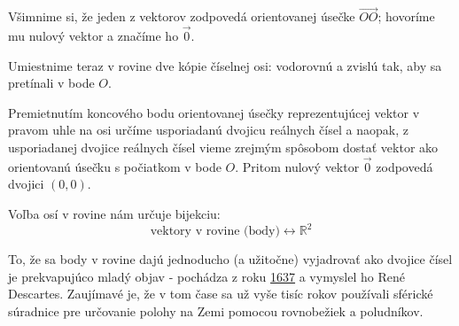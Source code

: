 \documentclass[11pt]{article}
\renewcommand{\vec}[1]{\overrightarrow{#1}}
\newcommand{\R}{\mathbb{R}}
\begin{document}
\begin{center}
\end{center}

Všimnime si, že jeden z vektorov zodpovedá orientovanej úsečke $\vec{OO}$; hovoríme mu nulový vektor a značíme ho $\vec{0}$.

Umiestnime teraz v rovine dve kópie číselnej osi: vodorovnú a zvislú tak, aby sa pretínali v bode $O$.
\begin{center}
\end{center}

Premietnutím koncového bodu orientovanej úsečky reprezentujúcej vektor v pravom uhle na osi určíme usporiadanú dvojicu reálnych čísel a naopak, z usporiadanej dvojice reálnych čísel vieme zrejmým spôsobom dostať vektor ako orientovanú úsečku s počiatkom v bode $O$. Pritom nulový vektor $\vec{0}$ zodpovedá dvojici $(0,0)$.

Voľba osí v rovine nám určuje bijekciu:
$$ \text{vektory v rovine (body)} \longleftrightarrow \R^2 $$

To, že sa body v rovine dajú jednoducho (a užitočne) vyjadrovať ako dvojice čísel je prekvapujúco mladý objav - pochádza z roku \underline{1637} a vymyslel ho René Descartes. Zaujímavé je, že v tom čase sa už vyše tisíc rokov používali sférické súradnice pre určovanie polohy na Zemi pomocou rovnobežiek a poludníkov.
\end{document}
